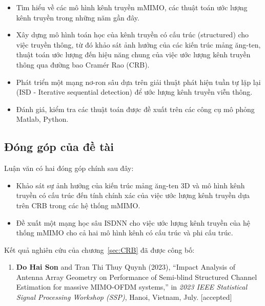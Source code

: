 \renewcommand{\labelitemi}{$-$}
\begin{itemize}
	\item Tìm hiểu về các mô hình kênh truyền mMIMO, các thuật toán ước lượng kênh truyền trong những năm gần đây.
    \item Xây dựng mô hình toán học của kênh truyền có cấu trúc (structured) cho việc truyền thông, từ đó khảo sát ảnh hưởng của các kiến trúc mảng ăng-ten, thuật toán ước lượng đến hiệu năng chung của việc ước lượng kênh truyền thông qua đường bao Cramér Rao (CRB).
    
	\item Phát triển một mạng nơ-ron sâu dựa trên giải thuật phát hiện tuần tự lặp lại (ISD - Iterative sequential detection) để ước lượng kênh truyền viễn thông.
	
 \item Đánh giá, kiểm tra các thuật toán được đề xuất trên các công cụ mô phỏng Matlab, Python.
\end{itemize} 
\vspace{0.3cm}

\subsection*{Đóng góp của đề tài}

Luận văn có hai đóng góp chính sau đây:
\renewcommand{\labelitemi}{$-$}
\begin{itemize}
    \item Khảo sát sự ảnh hưởng của kiến trúc mảng ăng-ten 3D và mô hình kênh truyền có cấu trúc đến tính chính xác của việc ước lượng kênh truyền dựa trên CRB trong các hệ thống mMIMO.
    
	\item Đề xuất một mạng học sâu ISDNN cho việc ước lượng kênh truyền của hệ thống mMIMO cho cả hai mô hình kênh có cấu trúc và phi cấu trúc.
\end{itemize} 

Kết quả nghiên cứu của chương~\ref{sec:CRB} đã được công bố:
\begin{enumerate}
    \item[] \textbf{Do Hai Son} and Tran Thi Thuy Quynh (2023), ``Impact Analysis of Antenna Array Geometry on Performance of Semi-blind Structured Channel Estimation for massive MIMO-OFDM systems,'' in \textit{2023 IEEE Statistical Signal Processing Workshop (SSP)}, Hanoi, Vietnam, July. [accepted]
\end{enumerate}

